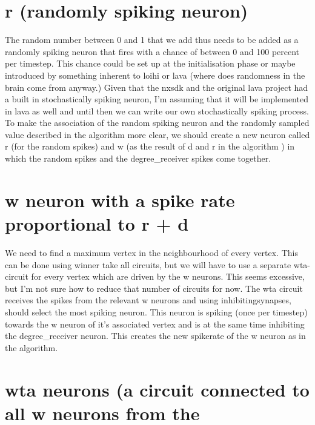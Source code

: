 \section{r (randomly spiking neuron)}\label{sec:random}
The random number between 0 and 1 that we add thus needs to be added as a
randomly spiking neuron that fires with a chance of between 0 and 100 percent
per timestep. This chance could be set up at the initialisation phase or maybe
introduced by something inherent to loihi or lava (where does randomness in
the brain come from anyway.) Given that the nxsdk and the original lava project
had a built in stochastically spiking neuron, I'm assuming that it will be
implemented in lava as well and until then we can write our own stochastically
spiking process. To make the association of the random spiking neuron and the
randomly sampled value described in the algorithm more clear, we should
create a new neuron called r (for the random spikes) and w (as the result of d
and r in the algorithm ) in which the random spikes and the degree_receiver
spikes come together.
\section{w neuron with a spike rate proportional to r + d}\label{sec:weight_neuron}
We need to find a maximum vertex in the neighbourhood of every vertex. This
can be done using winner take all circuits, but we will have to use a separate
wta-circuit for every vertex which are driven by the w neurons. This seems
excessive, but I'm not sure how to reduce that number of circuits for now. The
wta circuit receives the spikes from the relevant w neurons and using inhibitingsynapses, should select the most spiking neuron. This neuron is spiking (once
per timestep) towards the w neuron of it's associated vertex and is at the same
time inhibiting the degree_receiver neuron. This creates the new spikerate of
the w neuron as in the algorithm.

\section{wta neurons (a circuit connected to all w neurons from the}\label{sec:wta_circuits}

